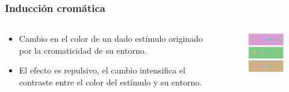 \documentclass[
    11pt, %
    aspectratio=169, %
]{beamer}
\begin{document}
\begin{frame}
	\frametitle{Inducción cromática}
            


\begin{columns}[c] %
		\begin{column}{0.4\textwidth} %
                \begin{itemize}
                    \item {} 
                    Cambio en el color de un dado estímulo originado por la cromaticidad de su entorno.\newline 
                    \item {}
                    El efecto es repulsivo, el cambio intensifica el contraste entre el color del estímulo y su entorno.
                \end{itemize}
                
                
		\end{column}
  		\begin{column}{0.6\textwidth} %
                \begin{figure}
                    \centering
                    \includegraphics[width=4.5cm]{Images/intro/ind_crom_ej.PNG}
                \end{figure}
		\end{column}
	\end{columns}


\end{frame}



\end{document}
